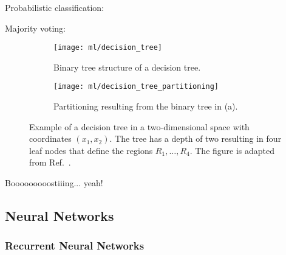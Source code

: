 Probabilistic classification:

Majority voting:



\begin{figure}[htbp]
  \centering

  \begin{subfigure}[b]{0.46\textwidth}
    \centering
    \texttt{[image: ml/decision\_tree]}
    \caption{Binary tree structure of a decision tree.}
  \end{subfigure}\hfill%
  \begin{subfigure}[b]{0.46\textwidth}
    \centering
    \texttt{[image: ml/decision\_tree\_partitioning]}
    \vspace*{0.7em}
    \caption{Partitioning resulting from the binary tree in (a).}
  \end{subfigure}\hfill%

  \caption{Example of a decision tree in a two-dimensional space with
    coordinates $(x_1, x_2)$. The tree has a depth of two resulting in four leaf
    nodes that define the regions $R_1, \dots, R_4$. The figure is adapted from
    Ref.~\cite{hastie09}.}%
  \label{fig:decision_tree}
\end{figure}

Booooooooostiiing... yeah!


\subsection{Neural Networks}

\subsubsection{Recurrent Neural Networks}%
\label{sec:rnn}


